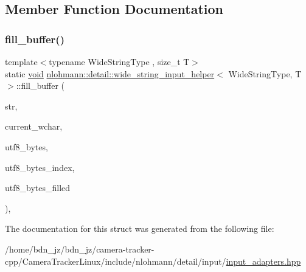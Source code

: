 \subsection{Member Function Documentation}
\mbox{\label{structnlohmann_1_1detail_1_1wide__string__input__helper_ae82d79118fa319a97e4a40568186a922}} 
\subsubsection{\texorpdfstring{fill\+\_\+buffer()}{fill\_buffer()}}
{\footnotesize\ttfamily template$<$typename Wide\+String\+Type , size\+\_\+t T$>$ \\
static \hyperlink{namespacenlohmann_1_1detail_a59fca69799f6b9e366710cb9043aa77d}{void} \hyperlink{structnlohmann_1_1detail_1_1wide__string__input__helper}{nlohmann\+::detail\+::wide\+\_\+string\+\_\+input\+\_\+helper}$<$ Wide\+String\+Type, T $>$\+::fill\+\_\+buffer (\begin{DoxyParamCaption}\item[{const Wide\+String\+Type \&}]{str,  }\item[{size\+\_\+t \&}]{current\+\_\+wchar,  }\item[{\hyperlink{namespacenlohmann_1_1detail_a1ed8fc6239da25abcaf681d30ace4985af1f713c9e000f5d3f280adbd124df4f5}{std\+::array}$<$ std\+::char\+\_\+traits$<$ char $>$\+::int\+\_\+type, 4 $>$ \&}]{utf8\+\_\+bytes,  }\item[{size\+\_\+t \&}]{utf8\+\_\+bytes\+\_\+index,  }\item[{size\+\_\+t \&}]{utf8\+\_\+bytes\+\_\+filled }\end{DoxyParamCaption})\hspace{0.3cm}{\ttfamily [inline]}, {\ttfamily [static]}}



The documentation for this struct was generated from the following file\+:\begin{DoxyCompactItemize}
\item 
/home/bdn\+\_\+jz/bdn\+\_\+jz/camera-\/tracker-\/cpp/\+Camera\+Tracker\+Linux/include/nlohmann/detail/input/\hyperlink{input__adapters_8hpp}{input\+\_\+adapters.\+hpp}\end{DoxyCompactItemize}
